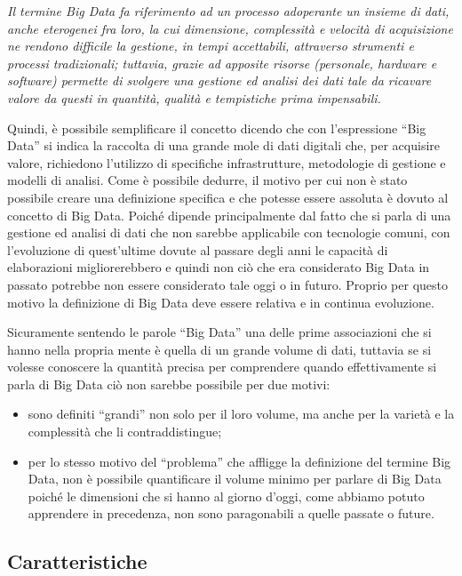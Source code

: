 \begin{center}
\textit{Il termine Big Data fa riferimento ad un processo adoperante un insieme di dati, anche eterogenei fra loro, la cui dimensione, complessità e velocità di acquisizione ne rendono difficile la gestione, in tempi accettabili, attraverso strumenti e processi tradizionali; tuttavia, grazie ad apposite risorse (personale, hardware e software) permette di svolgere una gestione ed analisi dei dati tale da ricavare valore da questi in quantità, qualità e tempistiche prima impensabili.}
\end{center}

Quindi, è possibile semplificare il concetto dicendo che con l'espressione “Big Data” si indica la raccolta di una grande mole di dati digitali che, per acquisire valore, richiedono l'utilizzo di specifiche infrastrutture, metodologie di gestione e modelli di analisi. Come è possibile dedurre, il motivo per cui non è stato possibile creare una definizione specifica e che potesse essere assoluta è dovuto al concetto di Big Data. Poiché dipende principalmente dal fatto che si parla di una gestione ed analisi di dati che non sarebbe applicabile con tecnologie comuni, con l'evoluzione di quest'ultime dovute al passare degli anni le capacità di elaborazioni migliorerebbero e quindi non ciò che era considerato Big Data in passato potrebbe non essere considerato tale oggi o in futuro. Proprio per questo motivo la definizione di Big Data deve essere relativa e in continua evoluzione.

Sicuramente sentendo le parole “Big Data” una delle prime associazioni che si hanno nella propria mente è quella di un grande volume di dati, tuttavia se si volesse conoscere la quantità precisa per comprendere quando effettivamente si parla di Big Data ciò non sarebbe possibile per due motivi:

\begin{itemize}
    \item sono definiti “grandi” non solo per il loro volume, ma anche per la varietà e la complessità che li contraddistingue;
    \item per lo stesso motivo del “problema” che affligge la definizione del termine Big Data, non è possibile quantificare il volume minimo per parlare di Big Data poiché le dimensioni che si hanno al giorno d'oggi, come abbiamo potuto apprendere in precedenza, non sono paragonabili a quelle passate o future.
\end{itemize}

\subsection{Caratteristiche}

